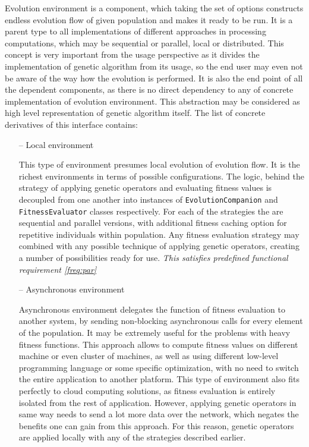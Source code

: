\begin{itemize}
Evolution environment is a component, which taking the set of options constructs endless evolution flow of given population and makes it ready to be run. It is a parent type to all implementations of different approaches in processing computations, which may be sequential or parallel, local or distributed. This concept is very important from the usage perspective as it divides the implementation of genetic algorithm from its usage, so the end user may even not be aware of the way how the evolution is performed. It is also the end point of all the dependent components, as there is no direct dependency to any of concrete implementation of evolution environment. This abstraction may be considered as high level representation of genetic algorithm itself. The list of concrete derivatives of this interface contains:
\begin{itemize}
\item[--]
Local environment

This type of environment presumes local evolution of evolution flow. It is the richest environments in terms of possible configurations. The logic, behind the strategy of applying genetic operators and evaluating fitness values is decoupled from one another into instances of \texttt{EvolutionCompanion} and \texttt{FitnessEvaluator} classes respectively. For each of the strategies the are sequential and parallel versions, with additional fitness caching option for repetitive individuals within population. Any fitness evaluation strategy may combined with any possible technique of applying genetic operators, creating a number of possibilities ready for use.
\smallskip\textit{This satisfies predefined functional requirement \ref{freq:par}}
\medbreak

\item[--]
Asynchronous environment

Asynchronous environment delegates the function of fitness evaluation to another system, by sending non-blocking asynchronous calls for every element of the population. It may be extremely useful for the problems with heavy fitness functions. This approach allows to compute fitness values on different machine or even cluster of machines, as well as using different low-level programming language or some specific optimization, with no need to switch the entire application to another platform. This type of environment also fits perfectly to cloud computing solutions, as fitness evaluation is entirely isolated from the rest of application. However, applying genetic operators in same way needs to send a lot more data over the network, which negates the benefits one can gain from this approach. For this reason, genetic operators are applied locally with any of the strategies described earlier.


\end{itemize}
\end{itemize}

